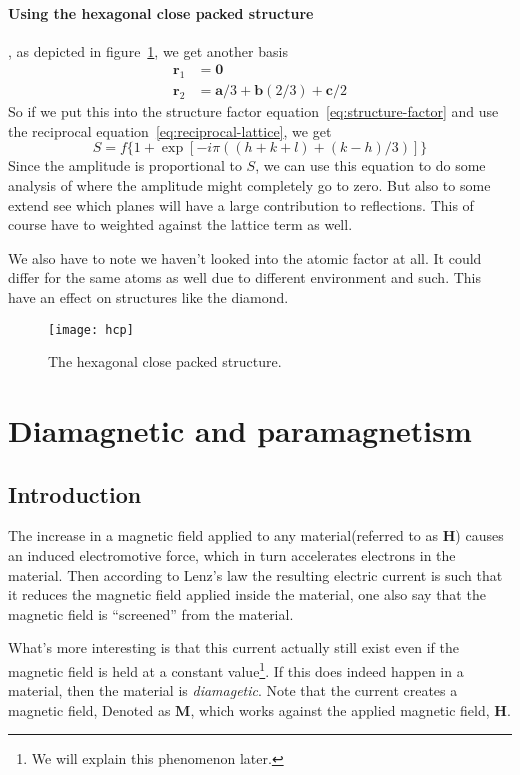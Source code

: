 \documentclass[11pt]{article}
\begin{document}
\newpage
\paragraph{Using the hexagonal close packed structure}, as depicted in figure~\ref{fig:hcp}, we get another basis 
\begin{align}
	\mathbf{r}_1 &= \mathbf{0} \\
	\mathbf{r}_2 &= \mathbf{a}/3+\mathbf{b}(2/3) + \mathbf{c}/2
\end{align}
So if we put this into the structure factor equation~\ref{eq:structure-factor} and use the reciprocal equation~\ref{eq:reciprocal-lattice}, we get
\begin{equation}
	S = f\{1+\exp{[-i\pi((h+k+l)+(k-h)/3)]}\}
\end{equation}
Since the amplitude is proportional to $S$, we can use this equation to do some analysis of where the amplitude might completely go to zero. But also to some extend see which planes will have a large contribution to reflections. This of course have to weighted against the lattice term as well.

We also have to note we haven't looked into the atomic factor at all. It could differ for the same atoms as well due to different environment and such. This have an effect on structures like the diamond.
\begin{figure}[!ht]
	\centering
	\texttt{[image: hcp]}
	\caption{The hexagonal close packed structure.}
	\label{fig:hcp}
\end{figure}

\newpage
\section{Diamagnetic and paramagnetism}
\subsection{Introduction}
The increase in a magnetic field applied to any material(referred to as $\mathbf{H}$) causes an induced electromotive force, which in turn accelerates electrons in the material. Then according to Lenz's law the resulting electric current is such that it reduces the magnetic field applied inside the material, one also say that the magnetic field is ``screened'' from the material.

What's more interesting is that this current actually still exist even if the magnetic field is held at a constant value\footnote{We will explain this phenomenon later.}. If this does indeed happen in a material, then the material is \emph{diamagetic}. Note that the current creates a magnetic field, Denoted as $\mathbf{M}$, which works against the applied magnetic field, $\mathbf{H}$.
\end{document}
